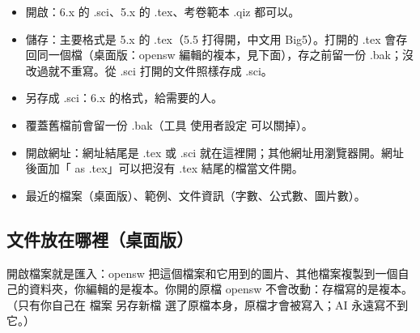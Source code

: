 \begin{itemize}
\item 開啟：6.x 的 .sci、5.x 的 .tex、考卷範本 .qiz 都可以。
\item 儲存：主要格式是 5.x 的 .tex（5.5 打得開，中文用 Big5）。打開的 .tex 會存回同一個檔（桌面版：opensw 編輯的複本，見下面），存之前留一份 .bak；沒改過就不重寫。從 .sci 打開的文件照樣存成 .sci。
\item 另存成 .sci：6.x 的格式，給需要的人。
\item 覆蓋舊檔前會留一份 .bak（工具 \TEXTsymbol{>} 使用者設定 可以關掉）。
\item 開啟網址：網址結尾是 .tex 或 .sci 就在這裡開；其他網址用瀏覽器開。網址後面加「 as .tex」可以把沒有 .tex 結尾的檔當文件開。
\item 最近的檔案（桌面版）、範例、文件資訊（字數、公式數、圖片數）。
\end{itemize}

\subsection{文件放在哪裡（桌面版）}

開啟檔案就是匯入：opensw 把這個檔案和它用到的圖片、其他檔案複製到一個自己的資料夾，你編輯的是複本。你開的原檔 opensw 不會改動：存檔寫的是複本。（只有你自己在 檔案 \TEXTsymbol{>} 另存新檔 選了原檔本身，原檔才會被寫入；AI 永遠寫不到它。）

